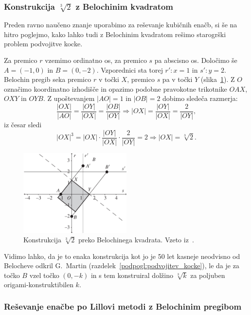 \subsubsection*{Konstrukcija $\sqrt[3]{2}$ z Belochinim kvadratom}
\label{podpogl:beloch_kvadrat_koren}

Preden ravno naučeno znanje uporabimo za reševanje kubičnih enačb, si še na hitro poglejmo, kako lahko tudi z Belochinim kvadratom rešimo starogrški problem podvojitve kocke.

Za premico $r$ vzemimo ordinatno os, za premico $s$ pa abscisno os. Določimo še $A = (-1,0)$ in $B = (0, -2)$. Vzporednici sta torej $r': x = 1$ in $s': y = 2$. Belochin pregib seka premico $r$ v točki $X$, premico $s$ pa v točki $Y$ (slika~\ref{fig:beloch_koren}). Z $O$ označimo koordinatno izhodišče in opazimo podobne pravokotne trikotnike $OAX$, $OXY$ in $OYB$. Z upoštevanjem $|AO| = 1 $ in $|OB| = 2$ dobimo sledeča razmerja:
$$ \frac{|OX|}{|AO|} = \frac{|OY|}{|OX|} = \frac{|OB|}{|OY|} \Longrightarrow |OX| = \frac{|OY|}{|OX|} = \frac{2}{|OY|}, $$
iz česar sledi
$$ |OX|^3 = |OX| \cdot \frac{|OY|}{|OX|} \cdot \frac{2}{|OY|} = 2 \Longrightarrow |OX| = \sqrt[3]{2}. $$

\begin{figure}[h]
    \centering
    \includegraphics[width=0.5\textwidth]{images/kubična enačba/beloch_koren.png}
    \caption[Konstrukcija kubičnega korena števila dva]{Konstrukcija $\sqrt[3]{2}$ preko Belochinega kvadrata. Vzeto iz~\cite[str.\ 310]{hull2011}.}
    \label{fig:beloch_koren}
\end{figure}

Vidimo lahko, da je to enaka konstrukcija kot jo je 50 let kasneje neodvisno od Belocheve odkril G.\ Martin (razdelek~\ref{podpogl:podvojitev_kocke}), le da je za točko $B$ vzel točko $(0, -k)$ in s tem konstruiral dolžino $\sqrt[3]{k}$ za poljuben origami-konstruktibilen $k$.

\subsubsection{Reševanje enačbe po Lillovi metodi z Belochinim pregibom}

